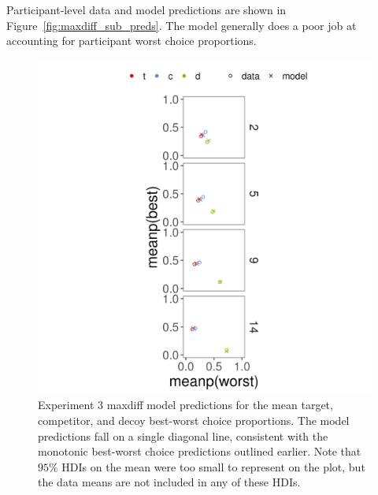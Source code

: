 Participant-level data and model predictions are shown in Figure~\ref{fig:maxdiff_sub_preds}. The model generally does a poor job at accounting for participant worst choice proportions.

\begin{figure}
   \centering
   \includegraphics[width=\linewidth]{figures/maxdiff_1_means_model_v_data.jpeg}
   \caption{Experiment 3 maxdiff model predictions for the mean target, competitor, and decoy best-worst choice proportions. The model predictions fall on a single diagonal line, consistent with the monotonic best-worst choice predictions outlined earlier. Note that $95\%$ HDIs on the mean were too small to represent on the plot, but the data means are not included in any of these HDIs.}
   \label{fig:maxdiff_collapsed_preds}
\end{figure}

